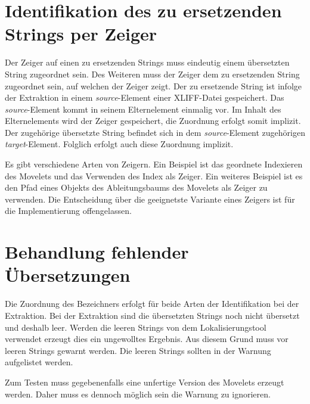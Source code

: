\section{Identifikation des zu ersetzenden Strings per Zeiger}
\label{sec:zeigeridentifier}
Der Zeiger auf einen zu ersetzenden Strings muss eindeutig einem übersetzten String zugeordnet sein. Des Weiteren muss der Zeiger dem zu ersetzenden String zugeordnet sein, auf welchen der Zeiger zeigt. Der zu ersetzende String ist infolge der Extraktion in einem \mbox{\textit{source}}-Element einer \ac{XLIFF}-Datei gespeichert. Das \mbox{\textit{source}}-Element kommt in seinem Elternelement einmalig vor. Im Inhalt des Elternelements wird der Zeiger gespeichert, die Zuordnung erfolgt somit implizit. Der zugehörige übersetzte String befindet sich in dem \mbox{\textit{source}}-Element zugehörigen \mbox{\textit{target}}-Element. Folglich erfolgt auch diese Zuordnung implizit. 
\par
Es gibt verschiedene Arten von Zeigern. Ein Beispiel ist das geordnete Indexieren des Movelets und das Verwenden des Index als Zeiger. Ein weiteres Beispiel ist es den Pfad eines Objekts des Ableitungsbaums des Movelets als Zeiger zu verwenden. Die Entscheidung über die geeignetste Variante eines Zeigers ist für die Implementierung offengelassen.
\section{Behandlung fehlender Übersetzungen}
Die Zuordnung des Bezeichners erfolgt für beide Arten der Identifikation bei der Extraktion. Bei der Extraktion sind die übersetzten Strings noch nicht übersetzt und deshalb leer. Werden die leeren Strings von dem Lokalisierungstool verwendet erzeugt dies ein ungewolltes Ergebnis. Aus diesem Grund muss vor leeren Strings gewarnt werden. Die leeren Strings sollten in der Warnung aufgelistet werden.
\par
Zum Testen muss gegebenenfalls eine unfertige Version des Movelets erzeugt werden. Daher muss es dennoch möglich sein die Warnung zu ignorieren.
